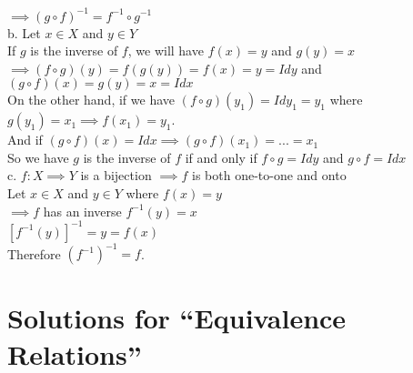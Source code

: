 $\implies (g\circ f)^{-1}=f^{-1}\circ g^{-1}$\\
b. Let $x\in X$ and $y\in Y$\\
If $g$ is the inverse of $f$, we will have $f(x)=y$ and $g(y)=x$\\
$\implies (f\circ g)(y)=f(g(y))=f(x)=y=Idy$ and $(g\circ f)(x)=g(y)=x=Idx$\\
On the other hand, if we have $(f\circ g)(y_1)=Idy_1=y_1$ where $g(y_1)=x_1 \implies f(x_1)=y_1$.\\
And if $(g\circ f)(x)=Idx \implies (g\circ f)(x_1)=...=x_1$\\
So we have $g$ is the inverse of $f$ if and only if $f\circ g=Idy$ and $g\circ f=Idx$\\
c. $f: X\implies Y$ is a bijection $\implies f$ is both one-to-one and onto\\
Let $x\in X$ and $y\in Y$ where $f(x)=y$\\
$\implies f$ has an inverse $f^{-1}(y)=x$\\
$[f^{-1}(y)]^{-1}=y=f(x)$\\
Therefore $(f^{-1})^{-1}=f$.\\

\section{Solutions for  ``Equivalence Relations''}
\noindent{}\bigskip


